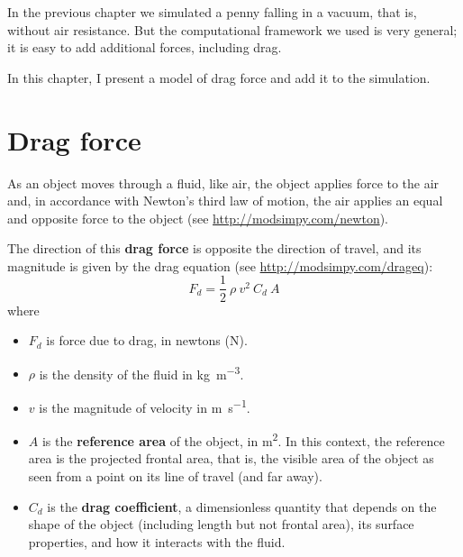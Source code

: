 \documentclass[12pt]{book}
\theoremstyle{exercise}
\begin{document}
In the previous chapter we simulated a penny falling in a vacuum, that is, without air resistance.  But the computational framework we used is very general; it is easy to add additional forces, including drag.

In this chapter, I present a model of drag force and add it to the simulation.


\section{Drag force}
\label{drag}

As an object moves through a fluid, like air, the object applies force to the air and, in accordance with Newton's third law of motion, the air applies an equal and opposite force to the object (see \url{http://modsimpy.com/newton}).


The direction of this {\bf drag force} is opposite the direction of travel, and its magnitude is given by the drag equation (see \url{http://modsimpy.com/drageq}):
%
\[ F_d = \frac{1}{2}~\rho~v^2~C_d~A \]
%
where

\begin{itemize}

\item $F_d$ is force due to drag, in newtons (\si{\newton}).

\item $\rho$ is the density of the fluid in \si{\kg\per\meter\cubed}.

\item $v$ is the magnitude of velocity in \si{\meter\per\second}.

\item $A$ is the {\bf reference area} of the object, in \si{\meter\squared}.  In this context, the reference area is the projected frontal area, that is, the visible area of the object as seen from a point on its line of travel (and far away).


\item $C_d$ is the {\bf drag coefficient}, a dimensionless quantity that depends on the shape of the object (including length but not frontal area), its surface properties, and how it interacts with the fluid.


\end{itemize}
\end{document}
